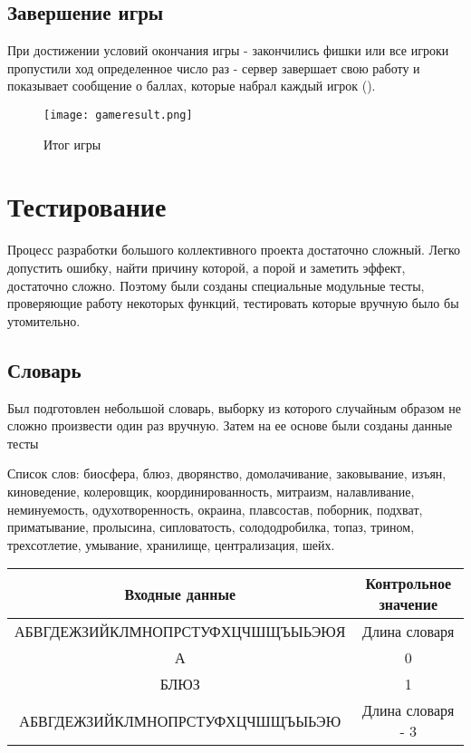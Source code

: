 \documentclass[a4paper,14pt]{article}
\begin{document}
	\subsection{Завершение игры}
	При достижении условий окончания игры - закончились фишки или все игроки пропустили ход определенное число раз - сервер завершает свою работу и показывает сообщение о баллах, которые набрал каждый игрок ().
	
	\begin{figure}[bhtp]
		\centering
		\texttt{[image: gameresult.png]}
		\caption{Итог игры}\label{img:gameresult}
		\label{img:endGame}
	\end{figure}
\section{Тестирование}
	Процесс разработки большого коллективного проекта достаточно сложный.
	Легко допустить ошибку, найти причину которой, а порой и заметить эффект, достаточно сложно. Поэтому были созданы специальные модульные тесты, проверяющие работу некоторых функций, тестировать которые вручную было бы утомительно.
	
	\subsection{Словарь}
	Был подготовлен небольшой словарь, выборку из которого случайным образом не сложно произвести один раз вручную.
	Затем на ее основе были созданы данные тесты
	
	Список слов: биосфера, блюз, дворянство, домолачивание, заковывание, изъян, киноведение, колеровщик, координированность, митраизм, налавливание, неминуемость, одухотворенность, окраина, плавсостав, поборник, подхват, приматывание, пролысина, сипловатость, солододробилка, топаз, трином, трехсотлетие, умывание, хранилище, централизация, шейх.
	\begin{table}[!h]
		\begin{center}
		\begin{flushleft}
		\end{flushleft}
		
		\begin{tabular}{|c|c|}
			\hline
			         Входные данные          & Контрольное значение \\ \hline
			АБВГДЕЖЗИЙКЛМНОПРСТУФХЦЧШЩЪЫЬЭЮЯ &    Длина словаря     \\ \hline
			               А                 &          0           \\ \hline
			              БЛЮЗ               &          1           \\ \hline
			АБВГДЕЖЗИЙКЛМНОПРСТУФХЦЧШЩЪЫЬЭЮ  &  Длина словаря - 3   \\ \hline
		\end{tabular}
		\end{center}
	\end{table}
\end{document}
